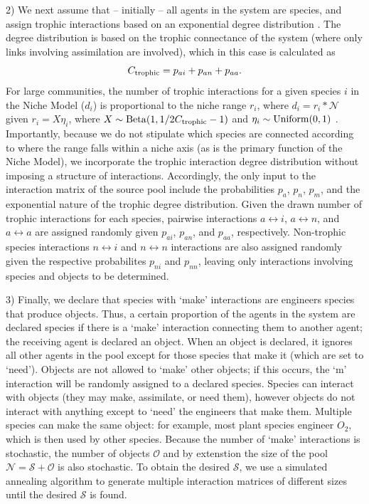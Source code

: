 \documentclass[twocolumn,preprintnumbers,amsmath,amssymb,superscriptaddress]{revtex4}
\begin{document}
2) We next assume that -- initially -- all agents in the system are species, and assign trophic interactions based on an exponential degree distribution \cite{Williams:2000wt}.
The degree distribution is based on the trophic connectance of the system (where only links involving assimilation are involved), which in this case is calculated as 
\begin{equation}
  C_{\rm trophic} = p_{ai}+p_{an}+p_{aa}.
\end{equation}
For large communities, the number of trophic interactions for a given species $i$ in the Niche Model ($d_i$) is proportional to the niche range $r_i$, where $d_i = r_i*\mathcal{N}$ given $r_i = X\eta_i$, where $X \sim {\rm Beta}(1,1/2C_{\rm trophic} - 1)$ and $\eta_i \sim {\rm Uniform}(0,1)$ \cite{Williams:2000wt}. %
Importantly, because we do not stipulate which species are connected according to where the range falls within a niche axis (as is the primary function of the Niche Model), we incorporate the trophic interaction degree distribution without imposing a structure of interactions.
Accordingly, the only input to the interaction matrix of the source pool include the probabilities $p_a$, $p_n$, $p_m$, and the exponential nature of the trophic degree distribution.
Given the drawn number of trophic interactions for each species, pairwise interactions $a \leftrightarrow i$, $a \leftrightarrow n$, and $a \leftrightarrow a$ are assigned randomly given $p_{ai}$, $p_{an}$, and $p_{aa}$, respectively.
Non-trophic species interactions $n \leftrightarrow i$ and $n \leftrightarrow n$ interactions are also assigned randomly given the respective probabilites $p_{ni}$ and $p_{nn}$, leaving only interactions involving species and objects to be determined.


3) Finally, we declare that species with `make' interactions are engineers species that produce objects.
Thus, a certain proportion of the agents in the system are declared species if there is a `make' interaction connecting them to another agent; the receiving agent is declared an object.
When an object is declared, it ignores all other agents in the pool except for those species that make it (which are set to `need').
Objects are not allowed to `make' other objects; if this occurs, the `m' interaction will be randomly assigned to a declared species.
Species can interact with objects (they may make, assimilate, or need them), however objects do not interact with anything except to `need' the engineers that make them.
Multiple species can make the same object: for example, most plant species engineer $O_2$, which is then used by other species.
Because the number of `make' interactions is stochastic, the number of objects $\mathcal{O}$ and by extenstion the size of the pool $\mathcal{N} = \mathcal{S} + \mathcal{O}$ is also stochastic.
To obtain the desired $\mathcal{S}$, we use a simulated annealing algorithm to generate multiple interaction matrices of different sizes until the desired $\mathcal{S}$ is found.
\end{document}
